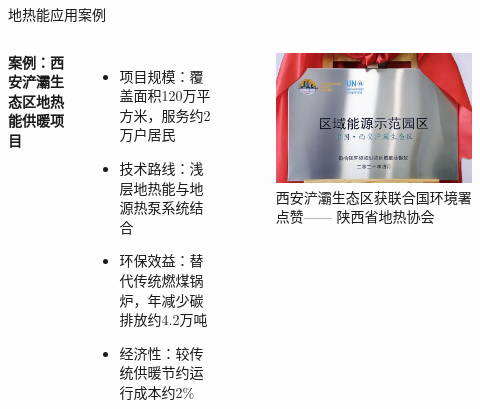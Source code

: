 \documentclass[aspectratio=169]{beamer}
\begin{document}
\begin{frame}{地热能应用案例}
  \begin{columns}
    \textbf{案例：西安浐灞生态区地热能供暖项目}
    \begin{itemize}
      \item 项目规模：覆盖面积120万平方米，服务约2万户居民
      \item 技术路线：浅层地热能与地源热泵系统结合
      \item 环保效益：替代传统燃煤锅炉，年减少碳排放约4.2万吨
      \item 经济性：较传统供暖节约运行成本约2\%\cite{Yang2023}
    \end{itemize}
    \begin{figure}
      \centering
      \caption{西安浐灞生态区获联合国环境署点赞—— 陕西省地热协会}
      \includegraphics[width=\textwidth]{fig/西安浐灞生态区.jpg}
    \end{figure}
  \end{columns}
\end{frame}
\end{document}
